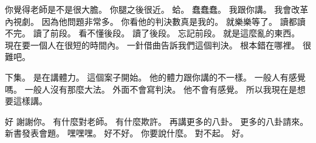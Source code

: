 \hypertarget{c01:cue:2033}{}你覺得老師是不是很大膽。
\hypertarget{c01:cue:2034}{}你腿之後很近。
\hypertarget{c01:cue:2035}{}蛤。
\hypertarget{c01:cue:2036}{}蠢蠢蠢。
\hypertarget{c01:cue:2037}{}我跟你講。
\hypertarget{c01:cue:2038}{}我會改革內視劇。
\hypertarget{c01:cue:2039}{}因為他問題非常多。
\hypertarget{c01:cue:2040}{}你看他的判決數真是我的。
\hypertarget{c01:cue:2041}{}就樂樂等了。
\hypertarget{c01:cue:2042}{}讀都讀不完。
\hypertarget{c01:cue:2043}{}讀了前段。
\hypertarget{c01:cue:2044}{}看不懂後段。
\hypertarget{c01:cue:2045}{}讀了後段。
\hypertarget{c01:cue:2046}{}忘記前段。
\hypertarget{c01:cue:2047}{}就是這麼亂的東西。
\hypertarget{c01:cue:2048}{}現在要一個人在很短的時間內。
\hypertarget{c01:cue:2049}{}一針借曲告訴我們這個判決。
\hypertarget{c01:cue:2050}{}根本錯在哪裡。
\hypertarget{c01:cue:2051}{}很難吧。

\hypertarget{c01:cue:2052}{}下集。
\hypertarget{c01:cue:2053}{}是在講體力。
\hypertarget{c01:cue:2054}{}這個案子開始。
\hypertarget{c01:cue:2055}{}他的體力跟你講的不一樣。
\hypertarget{c01:cue:2056}{}一般人有感覺嗎。
\hypertarget{c01:cue:2057}{}一般人沒有那麼大法。
\hypertarget{c01:cue:2058}{}外面不會寫判決。
\hypertarget{c01:cue:2059}{}他不會有感覺。
\hypertarget{c01:cue:2060}{}所以我現在是想要這樣講。

\hypertarget{c01:cue:2061}{}好 謝謝你。
\hypertarget{c01:cue:2062}{}有什麼對老師。
\hypertarget{c01:cue:2063}{}有什麼欺許。
\hypertarget{c01:cue:2064}{}再講更多的八卦。
\hypertarget{c01:cue:2065}{}更多的八卦請來。
\hypertarget{c01:cue:2066}{}新書發表會題。
\hypertarget{c01:cue:2067}{}嘿嘿嘿。
\hypertarget{c01:cue:2068}{}好不好。
\hypertarget{c01:cue:2069}{}你要說什麼。
\hypertarget{c01:cue:2070}{}對不起。
\hypertarget{c01:cue:2071}{}好。

